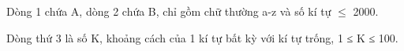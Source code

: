 Dòng 1 chứa A, dòng 2 chứa B, chỉ gồm chữ thường a-z và số kí tự  $\le$ 2000.  

   Dòng thứ 3 là số K, khoảng cách của 1 kí tự bất kỳ với kí tự trống, 1 ≤ K ≤ 100.